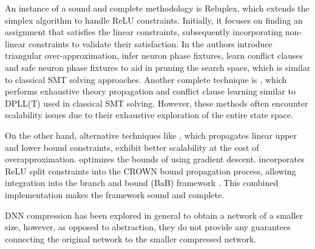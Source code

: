 An instance of a sound and complete methodology is Reluplex, which extends the 
simplex algorithm \cite{simplex} to 
handle ReLU constraints. Initially, it focuses on finding an assignment that 
satisfies the linear constraints, subsequently incorporating non-linear constraints 
to validate their satisfaction. In \cite{formal-ver-piece-wise}
the authors introduce triangular over-approximation, infer neuron phase fixtures,
learn conflict clauses and safe neuron phase fixtures to aid in pruning the search 
space, which is similar to classical SMT solving approaches. Another complete
technique is \neuralsat, which performs exhaustive theory propagation and
conflict clause learning similar to DPLL(T) used in classical SMT solving.
However, these methods often encounter scalability issues due to their
exhaustive exploration of the entire state space. 

On the other hand, alternative techniques like \cite{crown,deeppoly}, which
propagates linear upper and lower bound constraints, exhibit better
scalability at the cost of overapproximation. \cite{alpha-crown-bab-fnc} 
optimizes the bounds of \cite{crown} 
using gradient descent. 
\cite{beta-crown} incorporates ReLU split
constraints into the CROWN bound propagation process, allowing integration
into the branch and bound (BaB) framework
\cite{bab-fw,bab-piecewise-nn,bab-lagrangian-decomp}. 
This combined implementation makes the \abcrown framework sound and complete.

DNN compression has been explored \cite{dnn-compression} in general to obtain a
network of a smaller size, however, as opposed to abstraction, they do not
provide any guarantees connecting the original network to the smaller compressed
network. 
